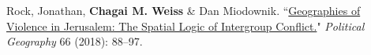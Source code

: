 \documentclass[11pt]{article}
\begin{document}
 Rock, Jonathan, \textbf{Chagai M. Weiss} \& Dan Miodownik. ``\href{https://www.sciencedirect.com/science/article/pii/S0962629817303323}{Geographies of Violence in Jerusalem: The Spatial Logic of Intergroup Conflict.}" \textit{Political Geography} 66 (2018): 88--97.

             
               
 
 
\end{document}
